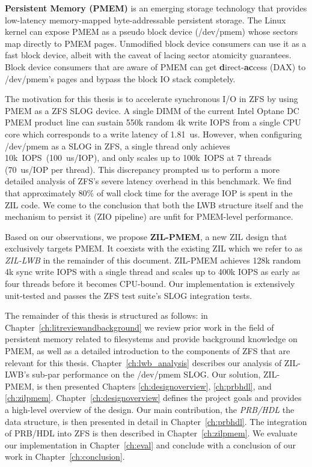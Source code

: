 \documentclass[12pt,a4paper,twoside]{book}
\begin{document}
\textbf{Persistent Memory (PMEM)} is an emerging storage technology that provides low-latency memory-mapped byte-addressable persistent storage.
The Linux kernel can expose PMEM as a pseudo block device (/dev/pmem) whose sectors map directly to PMEM pages.
Unmodified block device consumers can use it as a fast block device, albeit with the caveat of lacing sector atomicity guarantees.
Block device consumers that are aware of PMEM can get \textbf{d}irect-\textbf{ac}cess (DAX) to \mbox{/dev/pmem}'s pages and bypass the block IO stack completely.

The motivation for this thesis is to accelerate synchronous I/O in ZFS by using PMEM as a ZFS SLOG device.
A single DIMM of the current Intel Optane DC PMEM product line can sustain 550k random 4k write IOPS from a single CPU core which corresponds to a write latency of 1.81~us.
However, when configuring /dev/pmem as a SLOG in ZFS, a single thread only achieves 10k~IOPS~(100~us/IOP), and only scales up to 100k~IOPS at 7 threads (70~us/IOP per thread).
This discrepancy prompted us to perform a more detailed analysis of ZFS's severe latency overhead in this benchmark.
We find that approximately 80\% of wall clock time for the average IOP is spent in the ZIL code.
We come to the conclusion that both the LWB structure itself and the mechanism to persist it (ZIO pipeline) are unfit for PMEM-level performance.

Based on our observations, we propose \textbf{ZIL-PMEM}, a new ZIL design that exclusively targets PMEM.
It coexists with the existing ZIL which we refer to as \textit{ZIL-LWB} in the remainder of this document.
ZIL-PMEM achieves 128k random 4k sync write IOPS with a single thread and scales up to 400k IOPS as early as four threads before it becomes CPU-bound.
Our implementation is extensively unit-tested and passes the ZFS test suite's SLOG integration tests.

The remainder of this thesis is structured as follows:
in Chapter~\ref{ch:litreviewandbackground} we
 review prior work in the field of persistent memory related to filesystems and
 provide background knowledge on PMEM, as well as
 a detailed introduction to the components of ZFS that are relevant for this thesis.
Chapter~\ref{ch:lwb_analysis} describes our analysis of ZIL-LWB's sub-par performance on the /dev/pmem SLOG.
Our solution, \mbox{ZIL-PMEM}, is then presented Chapters \ref{ch:designoverview}, \ref{ch:prbhdl}, and \ref{ch:zilpmem}.
Chapter~\ref{ch:designoverview} defines the project goals and provides a high-level overview of the design.
Our main contribution, the \textit{PRB/HDL} the data structure, is then presented in detail in Chapter~\ref{ch:prbhdl}.
The integration of PRB/HDL into ZFS is then described in Chapter~\ref{ch:zilpmem}.
We evaluate our implementation in Chapter~\ref{ch:eval} and conclude with a conclusion of our work in Chapter~\ref{ch:conclusion}.
\end{document}
